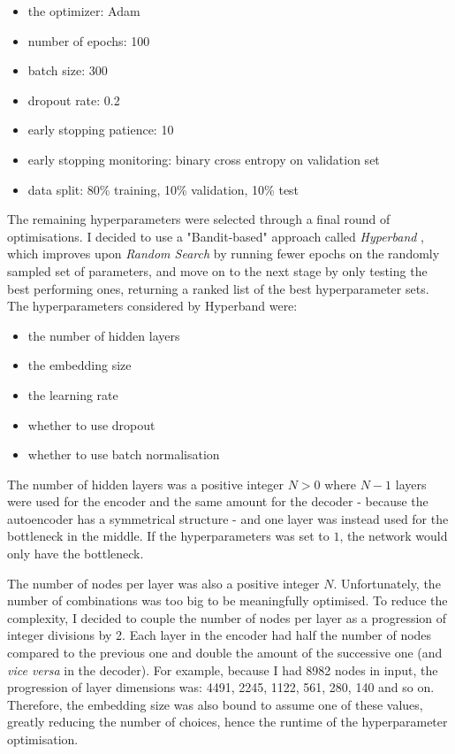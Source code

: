 \begin{itemize}
  \item the optimizer: Adam
  \item number of epochs: 100
  \item batch size: 300
  \item dropout rate: 0.2
  \item early stopping patience: 10
  \item early stopping monitoring: binary cross entropy on validation set
  \item data split: 80\% training, 10\% validation, 10\% test
\end{itemize}

The remaining hyperparameters were selected through a final round of optimisations. I decided to use a "Bandit-based" approach
called \textit{Hyperband} \cite{DBLP:journals/corr/LiJDRT16}, which improves upon \textit{Random Search}
by running fewer epochs on the randomly sampled set of parameters,
and move on to the next stage by only testing the best performing ones, returning a ranked list of the best hyperparameter sets.
The hyperparameters considered by Hyperband were:

\begin{itemize}
  \item the number of hidden layers
  \item the embedding size
  \item the learning rate
  \item whether to use dropout
  \item whether to use batch normalisation
\end{itemize}

The number of hidden layers was a positive integer $N > 0$ where $N-1$ layers were used for the encoder and the same amount for
the decoder - because the autoencoder has a symmetrical structure - and one layer was instead used for the bottleneck in the middle.
If the hyperparameters was set to $1$, the network would only have the bottleneck.

The number of nodes per layer was also a positive integer $N$. Unfortunately, the number of combinations was too big to be
meaningfully optimised. To reduce the complexity, I decided to couple the number of nodes per layer as a progression of integer divisions by 2.
Each layer in the encoder had half the number of nodes compared to the previous one and double the amount of the successive one
(and \textit{vice versa} in the decoder). For example, because I had 8982 nodes in input, the progression of layer dimensions
was: 4491, 2245, 1122, 561, 280, 140 and so on. Therefore, the embedding size was also bound to assume one of these values,
greatly reducing the number of choices, hence the runtime of the hyperparameter optimisation.

